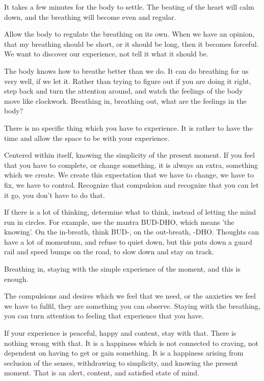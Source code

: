 It takes a few minutes for the body to settle. The beating of the heart
will calm down, and the breathing will become even and regular.

Allow the body to regulate the breathing on its own. When we have an
opinion, that my breathing should be short, or it should be long, then
it becomes forceful. We want to discover our experience, not tell it
what it should be.

The body knows how to breathe better than we do. It can do breathing for
us very well, if we let it. Rather than trying to figure out if you are
doing it right, step back and turn the attention around, and watch the
feelings of the body move like clockwork. Breathing in, breathing out,
what are the feelings in the body?

There is no specific thing which you have to experience. It is rather to
have the time and allow the space to be with your experience.

Centered within itself, knowing the simplicity of the present moment. If
you feel that you have to complete, or change something, it is always an
extra, something which we create. We create this expectation that we
have to change, we have to fix, we have to control. Recognize that
compulsion and recognize that you can let it go, you don't have to do
that.

If there is a lot of thinking, determine what to think, instead of
letting the mind run in circles. For example, use the mantra BUD-DHO,
which means 'the knowing'. On the in-breath, think BUD-, on the
out-breath, -DHO. Thoughts can have a lot of momentum, and refuse to
quiet down, but this puts down a guard rail and speed bumps on the road,
to slow down and stay on track.

Breathing in, staying with the simple experience of the moment, and this
is enough.

The compulsions and desires which we feel that we need, or the anxieties
we feel we have to fulfil, they are something you can observe. Staying
with the breathing, you can turn attention to feeling that experience
that you have.

If your experience is peaceful, happy and content, stay with that. There
is nothing wrong with that. It is a happiness which is not connected to
craving, not dependent on having to get or gain something. It is a
happiness arising from seclusion of the senses, withdrawing to
simplicity, and knowing the present moment. That is an alert, content,
and satisfied state of mind.

